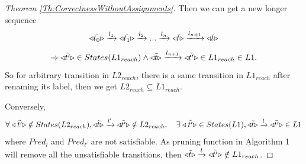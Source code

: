 \documentclass[smallcondensed]{svjour3}
\begin{document}
\begin{proof}[Theorem \ref{Th:CorrectnessWithoutAssignments}]
Then we can get a new longer sequence \[\triangleleft{\tilde{t_0}}\triangleright\xrightarrow{l_1}\triangleleft{\tilde{t_1}}\triangleright\xrightarrow{l_2}...\xrightarrow{l_{n}}\triangleleft{\tilde{t}}\triangleright\xrightarrow{l_{n+1}}\triangleleft{\tilde{t}}\triangleright\] \[\Rightarrow\triangleleft{\tilde{t'}}\triangleright\in States(L1_{reach})\wedge\triangleleft{\tilde{t}}\triangleright\xrightarrow{l_{n+1}}\triangleleft{\tilde{t'}}\triangleright\in L1_{reach}\in L1.\] So for arbitrary transition in $L2_{reach}$, there is a same transition in $L1_{reach}$ after renaming its label, then we get
$L2_{reach}\subseteq  L1_{reach}$.

Conversely,
\[\forall \triangleleft{\tilde{t'}}\triangleright\notin States(L2_{reach}), \triangleleft{\tilde{t}}\triangleright\xrightarrow{l'}\triangleleft{\tilde{t'}}\triangleright\notin L2_{reach},\quad\exists \triangleleft{\tilde{t'}}\triangleright\in States(L1), \triangleleft{\tilde{t}}\triangleright\xrightarrow{l}\triangleleft{\tilde{t'}}\triangleright\in L1\]
where $Pred_{l}$ and $Pred_{l'}$ are not satisfiable. As pruning function in Algorithm 1 will remove all the unsatisfiable transitions, then $\triangleleft{\tilde{t}}\triangleright\xrightarrow{l}\triangleleft{\tilde{t'}}\triangleright\notin L1_{reach}$. 


\end{proof}
\end{document}
